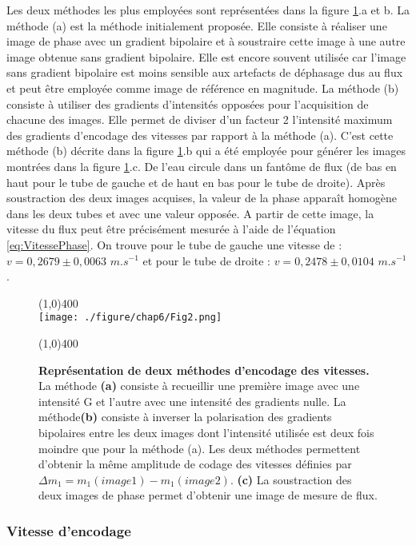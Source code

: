 Les deux méthodes les plus employées sont représentées dans la figure \ref{fig:MethodeGradientBip}.a et b. 
La méthode (a) est la méthode initialement proposée. Elle consiste à réaliser une image de phase avec un gradient bipolaire et à soustraire cette image à une autre image obtenue sans gradient bipolaire. Elle est encore souvent utilisée car l’image sans gradient bipolaire est moins sensible aux artefacts de déphasage dus au flux et peut être employée comme image de référence en magnitude.
La méthode (b) consiste à utiliser des gradients d’intensités opposées pour l’acquisition de chacune des images. Elle permet de diviser d’un facteur 2 l’intensité maximum des gradients d’encodage des vitesses par rapport à la méthode (a).
C'est cette méthode (b) décrite dans la figure \ref{fig:MethodeGradientBip}.b qui a été employée pour générer les images montrées dans la figure \ref{fig:MethodeGradientBip}.c. De l’eau circule dans un fantôme de flux (de bas en haut pour le tube de gauche et de haut en bas pour le tube de droite). Après soustraction des deux images acquises, la valeur de la phase apparaît homogène dans les deux tubes et avec une valeur opposée. A partir de cette image, la vitesse du flux peut être précisément mesurée à l'aide de l'équation \ref{eq:VitessePhase}. On trouve pour le tube de gauche une vitesse de : $v=0,2679 \pm 0,0063$ $m.s^{-1}$ et pour le tube de droite : $v=0,2478 \pm 0,0104$ $m.s^{-1}$.

\begin{figure}[h]
\centering
\line(1,0){400} \\
\texttt{[image: ./figure/chap6/Fig2.png]}
\caption[Représentation de deux méthodes d'encodage de vitesses.]{\label{fig:MethodeGradientBip} \textbf{Représentation de deux méthodes d'encodage des vitesses.} La méthode \textbf{(a)} consiste à recueillir une première image avec une intensité G et l'autre avec une intensité des gradients nulle. La méthode\textbf{(b)} consiste à inverser la polarisation des gradients bipolaires entre les deux images dont l'intensité utilisée est deux fois moindre que pour la méthode (a). Les deux méthodes permettent d'obtenir la même amplitude de codage des vitesses définies par $\Delta m_1 = m_1(image1) - m_1(image2)$. \textbf{(c)} La soustraction des deux images de phase permet d'obtenir une image de mesure de flux. }
\line(1,0){400} \\ 
\end{figure}

\subsubsection{Vitesse d'encodage}

